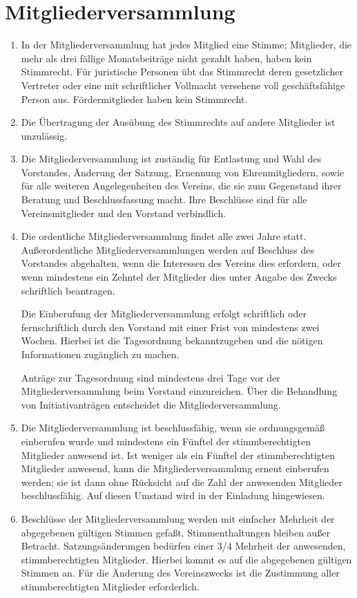 \documentclass[ngerman]{scrartcl}
\begin{document}
\section{Mitgliederversammlung} \label{sec:mitgliederversammlung}
\begin{enumerate}
 \item In der Mitgliederversammlung hat jedes Mitglied eine Stimme; 
 Mitglieder, die mehr als drei fällige Monatsbeiträge nicht gezahlt 
 haben, haben kein Stimmrecht. Für juristische Personen übt das 
 Stimmrecht deren gesetzlicher Vertreter  oder eine mit schriftlicher 
 Vollmacht versehene voll geschäftsfähige Person aus. Fördermitglieder
 haben kein Stimmrecht.

 \item Die Übertragung der Ausübung des Stimmrechts auf andere
 Mitglieder ist unzulässig.

 \item Die Mitgliederversammlung ist zuständig für Entlastung
 und Wahl des Vorstandes, Änderung der Satzung, Ernennung von
 Ehrenmitgliedern, sowie für alle weiteren Angelegenheiten des
 Vereins, die sie zum Gegenstand ihrer Beratung und
 Beschlussfassung macht. Ihre Beschlüsse sind für alle
 Vereinsmitglieder und den Vorstand verbindlich.

 \item Die ordentliche Mitgliederversammlung findet alle zwei Jahre statt. Außerordentliche
 Mitgliederversammlungen werden auf Beschluss des Vorstandes abgehalten, wenn die
 Interessen des Vereins dies erfordern, oder wenn mindestens ein Zehntel der Mitglieder dies
 unter Angabe des Zwecks schriftlich beantragen.

 Die Einberufung der Mitgliederversammlung erfolgt schriftlich oder fernschriftlich durch
 den Vorstand mit einer Frist von mindestens zwei Wochen. Hierbei ist die Tagesordnung
 bekanntzugeben und die nötigen Informationen zugänglich zu machen.

 Anträge zur Tagesordnung sind mindestens drei Tage vor der Mitgliederversammlung beim
 Vorstand einzureichen. Über die Behandlung von Initiativanträgen entscheidet die Mitgliederversammlung.

 \item Die Mitgliederversammlung ist beschlussfähig, wenn sie
 ordnungsgemäß einberufen wurde und mindestens ein Fünftel der
 stimmberechtigten Mitglieder anwesend ist. Ist weniger als
 ein Fünftel der stimmberechtigten Mitglieder anwesend, kann
 die  Mitgliederversammlung erneut einberufen werden; sie ist
 dann ohne Rücksicht auf die Zahl der anwesenden Mitglieder
 beschlussfähig. Auf diesen Umstand wird in der Einladung
 hingewiesen.

 \item Beschlüsse der Mitgliederversammlung werden mit einfacher
 Mehrheit der abgegebenen gültigen Stimmen gefaßt,
 Stimmenthaltungen bleiben außer Betracht. Satzungsänderungen
 bedürfen einer 3/4 Mehrheit der anwesenden, stimmberechtigten
 Mitglieder. Hierbei kommt es auf die abgegebenen gültigen
 Stimmen an. Für die Änderung des Vereinszwecks ist die
 Zustimmung aller stimmberechtigten Mitglieder erforderlich.
\end{enumerate}
\end{document}

